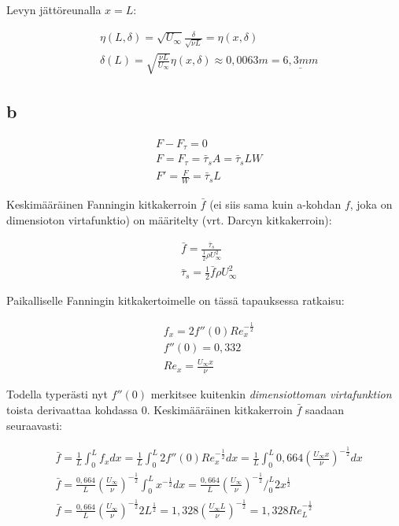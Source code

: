 \documentclass[12pt,a4paper,finnish]{article}
\begin{document}
Levyn jättöreunalla $x = L$:

\begin{align}
 &\eta(L, \delta) = \sqrt{U_{\infty}}\frac{\delta}{\sqrt{\nu L}} = \eta(x, \delta)\\
 &\delta(L) = \sqrt{\frac{\nu L}{U_{\infty}}}\eta(x, \delta) \approx 0,0063 m = \underline{6,3 mm}
\end{align}

\subsection{b} \label{13b}

\begin{align}
 &F - F_{\tau} = 0\\
 &F = F_{\tau} = \bar{\tau}_sA = \bar{\tau}_sLW\\
 &F' = \frac{F}{W} = \bar{\tau}_sL
\end{align}

Keskimääräinen Fanningin kitkakerroin $\bar{f}$ (ei siis sama kuin a-kohdan $f$, joka on dimensioton virtafunktio) 
on määritelty (vrt. Darcyn kitkakerroin):

\begin{align}
 &\bar{f} = \frac{\bar{\tau}_s}{\frac{1}{2}\rho U_{\infty}^2}\\
 &\bar{\tau}_s = \frac{1}{2}\bar{f}\rho U_{\infty}^2
\end{align}

Paikalliselle Fanningin kitkakertoimelle on tässä tapauksessa ratkaisu:

\begin{align}
 &f_x = 2f''(0)Re_x^{-\frac{1}{2}}\\
 &f''(0) = 0,332\\
 &Re_x = \frac{U_{\infty}x}{\nu}
\end{align}

Todella typerästi nyt $f''(0)$ merkitsee kuitenkin \textit{dimensiottoman virtafunktion} toista derivaattaa 
kohdassa $0$. Keskimääräinen kitkakerroin $\bar{f}$ saadaan seuraavasti:

\begin{align}
 &\bar{f} = \frac{1}{L}\int_0^Lf_xdx = \frac{1}{L}\int_0^L2f''(0)Re_x^{-\frac{1}{2}}dx 
  = \frac{1}{L}\int_0^L0,664\left(\frac{U_{\infty}x}{\nu}\right)^{-\frac{1}{2}}dx\\
 &\bar{f} = \frac{0,664}{L}\left(\frac{U_{\infty}}{\nu}\right)^{-\frac{1}{2}}\int_0^Lx^{-\frac{1}{2}}dx
  = \frac{0,664}{L}\left(\frac{U_{\infty}}{\nu}\right)^{-\frac{1}{2}}\bigg/_0^L2x^{\frac{1}{2}}\\
 &\bar{f} = \frac{0,664}{L}\left(\frac{U_{\infty}}{\nu}\right)^{-\frac{1}{2}}2L^{\frac{1}{2}}
  = 1,328\left(\frac{U_{\infty}L}{\nu}\right)^{-\frac{1}{2}} = 1,328Re_L^{-\frac{1}{2}}
\end{align}
\end{document}
